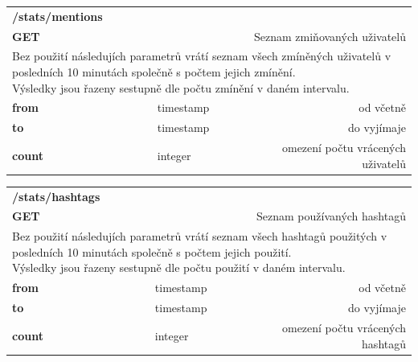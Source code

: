 \documentclass[thesis=B,czech]{FITthesis}[2012/06/26]
\begin{document}
\begin{table}[h]
\begin{tabular}{llllr}
\rowcolor[HTML]{EFEFEF}
\large \textbf{/stats/mentions}        &         &                 &        & \multicolumn{1}{l}{}                \\
\rowcolor[HTML]{EFEFEF}
\textbf{GET}          &         &                 &        & Seznam zmiňovaných uživatelů                        \\
\multicolumn{5}{l}{\parbox[t]{12.8cm}{Bez použití následujích parametrů vrátí seznam všech zmíněných uživatelů v posledních 10 minutách společně s počtem jejich zmínění. \\ Výsledky jsou řazeny sestupně dle počtu zmínění v daném intervalu. }  } \\
\textbf{from}         &         & timestamp       &        & od včetně                           \\
\textbf{to}           &         & timestamp       &        & do vyjímaje                         \\
\textbf{count}        &         & integer         &        & omezení počtu vrácených uživatelů     \\ 
\end{tabular}
\end{table}


\begin{table}[h]
\begin{tabular}{llllr}
\rowcolor[HTML]{EFEFEF}
\large \textbf{/stats/hashtags}        &         &                 &        & \multicolumn{1}{l}{}                \\
\rowcolor[HTML]{EFEFEF}
\textbf{GET}          &         &                 &        & Seznam používaných hashtagů                        \\
\multicolumn{5}{l}{\parbox[t]{12.8cm}{Bez použití následujích parametrů vrátí seznam všech hashtagů použitých v posledních 10 minutách společně s počtem jejich použití. \\ Výsledky jsou řazeny sestupně dle počtu použití v daném intervalu. }  } \\
\textbf{from}         &         & timestamp       &        & od včetně                           \\
\textbf{to}           &         & timestamp       &        & do vyjímaje                         \\
\textbf{count}        &         & integer         &        & omezení počtu vrácených hashtagů     \\
\end{tabular}
\end{table}
\end{document}
